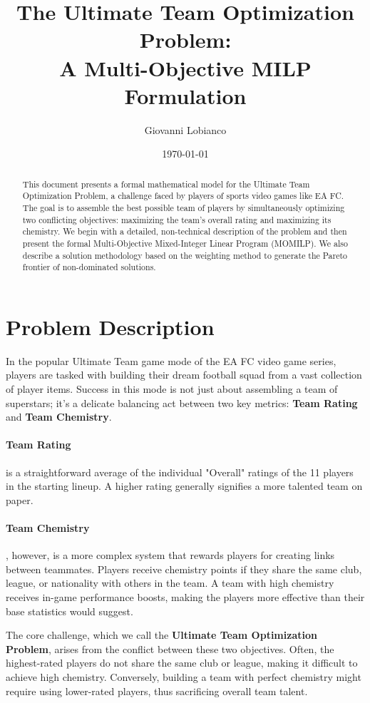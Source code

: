 \documentclass{article}
\title{The Ultimate Team Optimization Problem: \\ A Multi-Objective MILP Formulation}
\author{Giovanni Lobianco}
\date{\today}
\begin{document}
\maketitle

\begin{abstract}
This document presents a formal mathematical model for the Ultimate Team Optimization Problem, a challenge faced by players of sports video games like EA FC. The goal is to assemble the best possible team of players by simultaneously optimizing two conflicting objectives: maximizing the team's overall rating and maximizing its chemistry. We begin with a detailed, non-technical description of the problem and then present the formal Multi-Objective Mixed-Integer Linear Program (MOMILP). We also describe a solution methodology based on the weighting method to generate the Pareto frontier of non-dominated solutions.
\end{abstract}

\section{Problem Description}
In the popular Ultimate Team game mode of the EA FC video game series, players are tasked with building their dream football squad from a vast collection of player items. Success in this mode is not just about assembling a team of superstars; it's a delicate balancing act between two key metrics: \textbf{Team Rating} and \textbf{Team Chemistry}.

\paragraph{Team Rating} is a straightforward average of the individual "Overall" ratings of the 11 players in the starting lineup. A higher rating generally signifies a more talented team on paper.

\paragraph{Team Chemistry}, however, is a more complex system that rewards players for creating links between teammates. Players receive chemistry points if they share the same club, league, or nationality with others in the team. A team with high chemistry receives in-game performance boosts, making the players more effective than their base statistics would suggest.

The core challenge, which we call the \textbf{Ultimate Team Optimization Problem}, arises from the conflict between these two objectives. Often, the highest-rated players do not share the same club or league, making it difficult to achieve high chemistry. Conversely, building a team with perfect chemistry might require using lower-rated players, thus sacrificing overall team talent.
\end{document}
